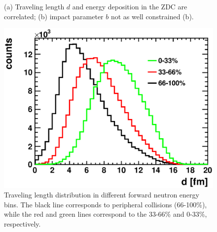 \begin{figure}[hbt!]
\begin{center} 
\quad
{}
\caption[geometry quantity correlation with neutron energy deposit]
{(a) Traveling length $d$ and energy deposition in the ZDC are correlated; (b) impact parameter $b$ not as well constrained (b). } \label{fig:geoCorrelation}
\end{center} 
\end{figure}



\begin{figure} 
\begin{center} 
\includegraphics[width=0.7\columnwidth,keepaspectratio]{plots/chpt7/tau9_travel_dist_constrain.eps}
\caption[Geometry quantity constrained by binning method]
{Traveling length distribution in different forward neutron energy bins. The black line corresponds to peripheral collisions (66-100\%), while
the red and green lines correspond to the 33-66\% and 0-33\%, respectively.}
\label{fig:geoConstrain}
\end{center} 
\end{figure}



